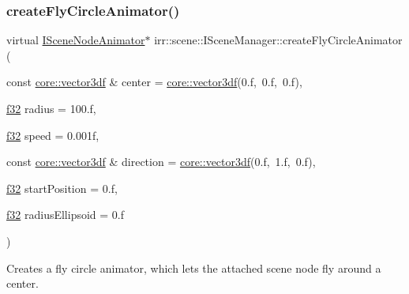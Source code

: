 \subsubsection{\texorpdfstring{create\+Fly\+Circle\+Animator()}{createFlyCircleAnimator()}\hspace{0.1cm}{\footnotesize\ttfamily [2/2]}}
{\footnotesize\ttfamily virtual \hyperlink{classirr_1_1scene_1_1ISceneNodeAnimator}{I\+Scene\+Node\+Animator}$\ast$ irr\+::scene\+::\+I\+Scene\+Manager\+::create\+Fly\+Circle\+Animator (\begin{DoxyParamCaption}\item[{const \hyperlink{namespaceirr_1_1core_ae6e2b2a6c552833ebbd5b7463d03586b}{core\+::vector3df} \&}]{center = {\ttfamily \hyperlink{namespaceirr_1_1core_ae6e2b2a6c552833ebbd5b7463d03586b}{core\+::vector3df}(0.f,~0.f,~0.f)},  }\item[{\hyperlink{namespaceirr_a0277be98d67dc26ff93b1a6a1d086b07}{f32}}]{radius = {\ttfamily 100.f},  }\item[{\hyperlink{namespaceirr_a0277be98d67dc26ff93b1a6a1d086b07}{f32}}]{speed = {\ttfamily 0.001f},  }\item[{const \hyperlink{namespaceirr_1_1core_ae6e2b2a6c552833ebbd5b7463d03586b}{core\+::vector3df} \&}]{direction = {\ttfamily \hyperlink{namespaceirr_1_1core_ae6e2b2a6c552833ebbd5b7463d03586b}{core\+::vector3df}(0.f,~1.f,~0.f)},  }\item[{\hyperlink{namespaceirr_a0277be98d67dc26ff93b1a6a1d086b07}{f32}}]{start\+Position = {\ttfamily 0.f},  }\item[{\hyperlink{namespaceirr_a0277be98d67dc26ff93b1a6a1d086b07}{f32}}]{radius\+Ellipsoid = {\ttfamily 0.f} }\end{DoxyParamCaption})\hspace{0.3cm}{\ttfamily [pure virtual]}}



Creates a fly circle animator, which lets the attached scene node fly around a center. 


